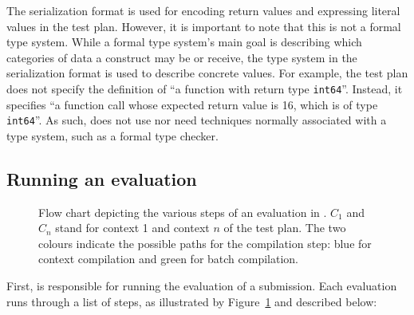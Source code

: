 \documentclass[5p,number]{elsarticle}
\begin{document}
    The serialization format is used for encoding return values and expressing literal values in the test plan.
    However, it is important to note that this is not a formal type system.
    While a formal type system's main goal is describing which categories of data a construct may be or receive, the type system in the serialization format is used to describe concrete values.
    For example, the test plan does not specify the definition of ``a function with return type \texttt{int64}''.
    Instead, it specifies ``a function call whose expected return value is 16, which is of type \texttt{int64}''.
    As such, \tested{} does not use nor need techniques normally associated with a type system, such as a formal type checker.

    \subsection{Running an evaluation}\label{subsec:running-an-evaluation}

    \begin{figure}
        \centering
        
        \caption{
        Flow chart depicting the various steps of an evaluation in \tested{}.
        $C_1$ and $C_n$ stand for context 1 and context $n$ of the test plan.
        The two colours indicate the possible paths for the compilation step: blue for context compilation and green for batch compilation.
        }
        \label{fig:tested-flow}
    \end{figure}

    First, \tested{} is responsible for running the evaluation of a submission.
    Each evaluation runs through a list of steps, as illustrated by Figure~\ref{fig:tested-flow} and described below:
\end{document}
